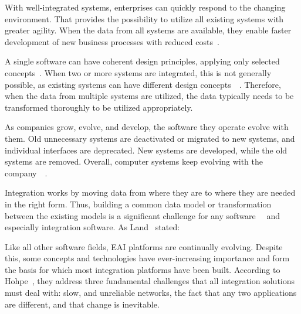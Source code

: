 \documentclass[english, 12pt, a4paper, sci, utf8, a-2b, online, obeyspaces]{aaltothesis}
\begin{document}
With well-integrated systems, enterprises can quickly respond to the changing environment. That provides the possibility to utilize all existing systems with greater agility. When the data from all systems are available, they enable faster development of new business processes with reduced costs~\cite{finkelstein2006enterprise}.

A single software can have coherent design principles, applying only selected concepts~\cite{brooks1995the}. When two or more systems are integrated, this is not generally possible, as existing systems can have different design concepts~\cite{garlan1995architectural}~\cite{garlan2009architectural}. Therefore, when the data from multiple systems are utilized, the data typically needs to be transformed thoroughly to be utilized appropriately.

As companies grow, evolve, and develop, the software they operate evolve with them. Old unnecessary systems are deactivated or migrated to new systems, and individual interfaces are deprecated. New systems are developed, while the old systems are removed. Overall, computer systems keep evolving with the company~\cite{garlan1995architectural}~\cite{garlan2009architectural}.

Integration works by moving data from where they are to where they are needed in the right form. Thus, building a common data model or transformation between the existing models is a significant challenge for any software~\cite{aiken1996data}~\cite{estublier2000software} and especially integration software. As Land~\cite[p. 338]{land3003software} stated:  

Like all other software fields, EAI platforms are continually evolving. Despite this, some concepts and technologies have ever-increasing importance and form the basis for which most integration platforms have been built. According to Hohpe~\cite{hohpe2004enterprise}, they address three fundamental challenges that all integration solutions must deal with: slow, and unreliable networks, the fact that any two applications are different, and that change is inevitable.
\end{document}
